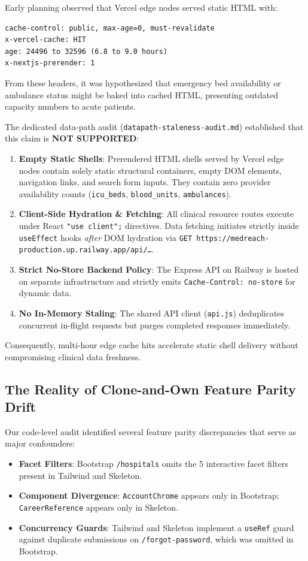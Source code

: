 \documentclass[conference]{IEEEtran}
\begin{document}
Early planning observed that Vercel edge nodes served static HTML with:
\begin{verbatim}
cache-control: public, max-age=0, must-revalidate
x-vercel-cache: HIT
age: 24496 to 32596 (6.8 to 9.0 hours)
x-nextjs-prerender: 1
\end{verbatim}
From these headers, it was hypothesized that emergency bed availability or ambulance status might be baked into cached HTML, presenting outdated capacity numbers to acute patients.

The dedicated data-path audit (\texttt{datapath-staleness-audit.md}) established that this claim is \textbf{NOT SUPPORTED}:
\begin{enumerate}
    \item \textbf{Empty Static Shells}: Prerendered HTML shells served by Vercel edge nodes contain solely static structural containers, empty DOM elements, navigation links, and search form inputs. They contain zero provider availability counts (\texttt{icu\_beds}, \texttt{blood\_units}, \texttt{ambulances}).
    \item \textbf{Client-Side Hydration \& Fetching}: All clinical resource routes execute under React \texttt{"use client";} directives. Data fetching initiates strictly inside \texttt{useEffect} hooks \textit{after} DOM hydration via \texttt{GET https://medreach-production.up.railway.app/api/\dots}.
    \item \textbf{Strict No-Store Backend Policy}: The Express API on Railway is hosted on separate infrastructure and strictly emits \texttt{Cache-Control: no-store} for dynamic data.
    \item \textbf{No In-Memory Staling}: The shared API client (\texttt{api.js}) deduplicates concurrent in-flight requests but purges completed responses immediately.
\end{enumerate}

Consequently, multi-hour edge cache hits accelerate static shell delivery without compromising clinical data freshness.

\subsection{The Reality of Clone-and-Own Feature Parity Drift}
Our code-level audit identified several feature parity discrepancies that serve as major confounders:
\begin{itemize}
    \item \textbf{Facet Filters}: Bootstrap \texttt{/hospitals} omits the 5 interactive facet filters present in Tailwind and Skeleton.
    \item \textbf{Component Divergence}: \texttt{AccountChrome} appears only in Bootstrap; \texttt{CareerReference} appears only in Skeleton.
    \item \textbf{Concurrency Guards}: Tailwind and Skeleton implement a \texttt{useRef} guard against duplicate submissions on \texttt{/forgot-password}, which was omitted in Bootstrap.
\end{itemize}
\end{document}

